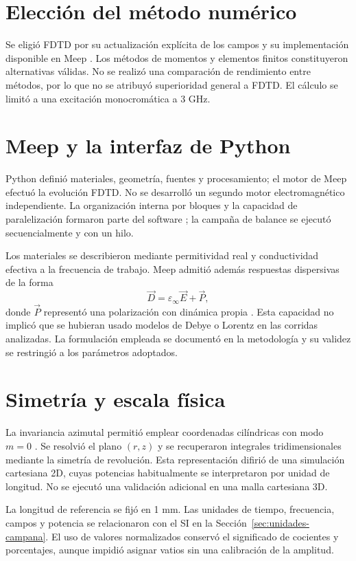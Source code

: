 \section{Elección del método numérico}
Se eligió FDTD por su actualización explícita de los campos y su implementación disponible en Meep \citep{Yee1966,Oskooi2010,Teixeira2023}. Los métodos de momentos y elementos finitos constituyeron alternativas válidas. No se realizó una comparación de rendimiento entre métodos, por lo que no se atribuyó superioridad general a FDTD. El cálculo se limitó a una excitación monocromática a 3 GHz.

\section{Meep y la interfaz de Python}
Python definió materiales, geometría, fuentes y procesamiento; el motor de Meep efectuó la evolución FDTD. No se desarrolló un segundo motor electromagnético independiente. La organización interna por bloques y la capacidad de paralelización formaron parte del software \citep{Oskooi2010,MeepParallel,Oskooi2020Machine}; la campaña de balance se ejecutó secuencialmente y con un hilo.

Los materiales se describieron mediante permitividad real y conductividad efectiva a la frecuencia de trabajo. Meep admitió además respuestas dispersivas de la forma
\begin{equation}
\vec D=\varepsilon_\infty\vec E+\vec P,
\end{equation}
donde $\vec P$ representó una polarización con dinámica propia \citep{MeepMaterials}. Esta capacidad no implicó que se hubieran usado modelos de Debye o Lorentz en las corridas analizadas. La formulación empleada se documentó en la metodología y su validez se restringió a los parámetros adoptados.

\section{Simetría y escala física}
La invariancia azimutal permitió emplear coordenadas cilíndricas con modo $m=0$ \citep{MeepCylindrical,MeepSymmetry}. Se resolvió el plano $(r,z)$ y se recuperaron integrales tridimensionales mediante la simetría de revolución. Esta representación difirió de una simulación cartesiana 2D, cuyas potencias habitualmente se interpretaron por unidad de longitud. No se ejecutó una validación adicional en una malla cartesiana 3D.

La longitud de referencia se fijó en 1 mm. Las unidades de tiempo, frecuencia, campos y potencia se relacionaron con el SI en la Sección~\ref{sec:unidades-campana}. El uso de valores normalizados conservó el significado de cocientes y porcentajes, aunque impidió asignar vatios sin una calibración de la amplitud.

